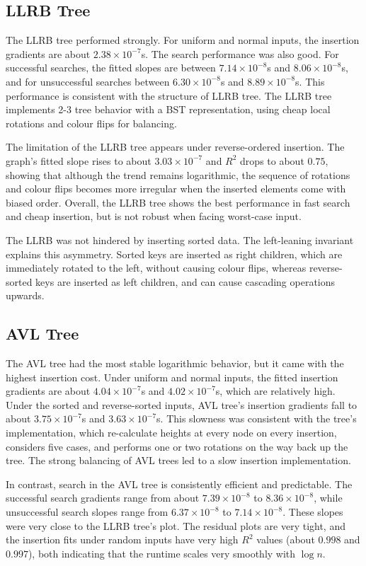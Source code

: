 \documentclass[12pt]{article}
\begin{document}
\subsection{LLRB Tree}
The LLRB tree performed strongly. For uniform and normal inputs, the insertion gradients are about 
$2.38 \times 10^{-7}$s. The search performance was also good. For successful searches, the fitted slopes are between $7.14 \times 10^{-8}$s and $8.06 \times 10^{-8}$s, and for unsuccessful searches between $6.30 \times 10^{-8}$s and $8.89 \times 10^{-8}$s.
This performance is consistent with the structure of LLRB tree. The LLRB tree implements 2-3 tree behavior with a BST representation, using cheap local rotations and colour flips for balancing.

The limitation of the LLRB tree appears under reverse-ordered insertion. The graph's fitted slope rises to about $3.03 \times 10^{-7}$ and $R^2$ drops to about $0.75$, showing that although the trend remains logarithmic, the sequence of rotations and colour flips becomes more irregular when the inserted elements come with biased order. Overall, the LLRB tree shows the best performance in fast search and cheap insertion, but is not  robust when facing worst-case input.

The LLRB was not hindered by inserting sorted data. The left-leaning invariant explains this asymmetry. Sorted keys are inserted as right children, which are immediately rotated to the left, without causing colour flips, whereas reverse-sorted keys are inserted as left children, and can cause cascading operations upwards.
\vspace{-1em}
\subsection{AVL Tree}
The AVL tree had the most stable logarithmic behavior, but it came with the highest insertion cost. Under uniform and normal inputs, the fitted insertion gradients are about $4.04 \times 10^{-7}$s and $4.02 \times 10^{-7}$s, which are relatively high. Under the sorted and reverse-sorted inputs, AVL tree's insertion gradients fall to about $3.75 \times 10^{-7}$s and $3.63 \times 10^{-7}$s. This slowness was consistent with the tree's implementation, which re-calculate heights at every node on every insertion, considers five cases, and performs one or two rotations on the way back up the tree. The strong balancing of AVL trees led to a slow insertion implementation. 

In contrast, search in the AVL tree is consistently efficient and predictable. The successful search gradients range from about $7.39 \times 10^{-8}$ to $8.36 \times 10^{-8}$, while unsuccessful search slopes range from  $6.37 \times 10^{-8}$ to $7.14 \times 10^{-8}$. These slopes were very close to the LLRB tree's plot. The residual plots are very tight, and the insertion fits under random inputs have very high $R^2$ values (about $0.998$ and $0.997$), both indicating that the runtime scales very smoothly with $\log n$. 
\end{document}

